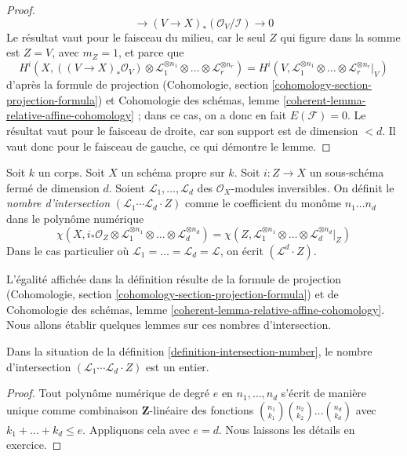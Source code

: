\begin{proof}
$$\to (V \to X)_*(\mathcal{O}_V/\mathcal{I}) \to 0
$$
Le résultat vaut pour le faisceau du milieu, car
le seul $Z$ qui figure dans la somme est $Z = V$,
avec $m_Z = 1$, et parce que
$$
H^i(X, ((V \to X)_*\mathcal{O}_V) \otimes 
 \mathcal{L}_1^{\otimes n_1} \otimes \ldots \otimes
\mathcal{L}_r^{\otimes n_r}) =
H^i(V,  \mathcal{L}_1^{\otimes n_1} \otimes \ldots \otimes
\mathcal{L}_r^{\otimes n_r}|_V)
$$
d'après la formule de projection
(Cohomologie, section \ref{cohomology-section-projection-formula}) et
Cohomologie des schémas, lemme
\ref{coherent-lemma-relative-affine-cohomology} ;
dans ce cas, on a donc en fait $E(\mathcal{F}) = 0$.
Le résultat vaut pour le faisceau de droite, car son support
est de dimension $< d$. Il vaut donc pour le faisceau
de gauche, ce qui démontre le lemme.
\end{proof}

\begin{definition}
\label{definition-intersection-number}
Soit $k$ un corps. Soit $X$ un schéma propre sur $k$. Soit
$i : Z \to X$ un sous-schéma fermé de dimension $d$. Soient
$\mathcal{L}_1, \ldots, \mathcal{L}_d$ des
$\mathcal{O}_X$-modules inversibles. On définit le {\it nombre d'intersection}
$(\mathcal{L}_1 \cdots \mathcal{L}_d \cdot Z)$
comme le coefficient du monôme $n_1 \ldots n_d$ dans le polynôme numérique
$$
\chi(X, i_*\mathcal{O}_Z \otimes \mathcal{L}_1^{\otimes n_1} \otimes
\ldots \otimes \mathcal{L}_d^{\otimes n_d}) =
\chi(Z, \mathcal{L}_1^{\otimes n_1} \otimes
\ldots \otimes \mathcal{L}_d^{\otimes n_d}|_Z)
$$
Dans le cas particulier
où $\mathcal{L}_1 = \ldots = \mathcal{L}_d = \mathcal{L}$,
on écrit $(\mathcal{L}^d \cdot Z)$.
\end{definition}

\noindent
L'égalité affichée dans la définition résulte de
la formule de projection
(Cohomologie, section \ref{cohomology-section-projection-formula}) et de
Cohomologie des schémas, lemme
\ref{coherent-lemma-relative-affine-cohomology}.
Nous allons établir quelques lemmes sur ces nombres d'intersection.

\begin{lemma}
\label{lemma-intersection-number-integer}
Dans la situation de la définition \ref{definition-intersection-number},
le nombre d'intersection
$(\mathcal{L}_1 \cdots \mathcal{L}_d \cdot Z)$
est un entier.
\end{lemma}

\begin{proof}
Tout polynôme numérique de degré $e$ en $n_1, \ldots, n_d$ s'écrit
de manière unique comme combinaison $\mathbf{Z}$-linéaire des fonctions
${n_1 \choose k_1}{n_2 \choose k_2} \ldots {n_d \choose k_d}$ avec
$k_1 + \ldots + k_d \leq e$. Appliquons cela avec $e = d$.
Nous laissons les détails en exercice.
\end{proof}

